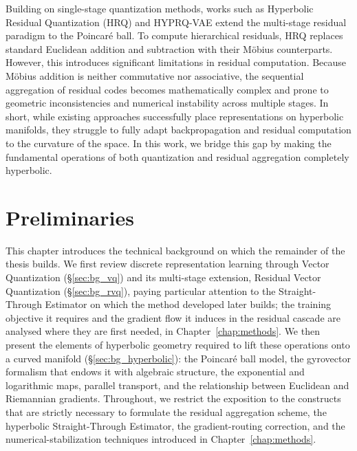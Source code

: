\documentclass[12pt]{report}
\begin{document}
Building on single-stage quantization methods, works such as Hyperbolic Residual Quantization (HRQ) \cite{hrqvae} and HYPRQ-VAE \cite{hyprqvae_recsys} extend the multi-stage residual paradigm to the Poincar\'e ball. To compute hierarchical residuals, HRQ replaces standard Euclidean addition and subtraction with their M\"obius counterparts. However, this introduces significant limitations in residual computation. Because M\"obius addition is neither commutative nor associative, the sequential aggregation of residual codes becomes mathematically complex and prone to geometric inconsistencies and numerical instability across multiple stages. In short, while existing approaches successfully place representations on hyperbolic manifolds, they struggle to fully adapt backpropagation and residual computation to the curvature of the space. In this work, we bridge this gap by making the fundamental operations of both quantization and residual aggregation completely hyperbolic.
\chapter{Preliminaries}
\label{chap:background}

This chapter introduces the technical background on which the remainder of the thesis builds. We first review discrete representation learning through Vector Quantization (\S\ref{sec:bg_vq}) and its multi-stage extension, Residual Vector Quantization (\S\ref{sec:bg_rvq}), paying particular attention to the Straight-Through Estimator on which the method developed later builds; the training objective it requires and the gradient flow it induces in the residual cascade are analysed where they are first needed, in Chapter~\ref{chap:methods}. We then present the elements of hyperbolic geometry required to lift these operations onto a curved manifold (\S\ref{sec:bg_hyperbolic}): the Poincar\'e ball model, the gyrovector formalism that endows it with algebraic structure, the exponential and logarithmic maps, parallel transport, and the relationship between Euclidean and Riemannian gradients. Throughout, we restrict the exposition to the constructs that are strictly necessary to formulate the residual aggregation scheme, the hyperbolic Straight-Through Estimator, the gradient-routing correction, and the numerical-stabilization techniques introduced in Chapter~\ref{chap:methods}.
\end{document}
